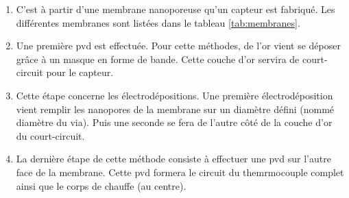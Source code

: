 \begin{itemize}
          \begin{enumerate}[label=(\alph*), wide, labelwidth=!, labelindent = 0pt]
              \item C'est à partir d'une membrane nanoporeuse qu'un capteur est fabriqué. Les différentes membranes sont listées dans le tableau
                    \ref{tab:membranes}. 
              \item Une première \gls{pvd} est effectuée. Pour cette méthodes, de l'or vient se déposer grâce à un masque en forme de bande.
                    Cette couche d'or servira de court-circuit pour le capteur. 
              \item Cette étape concerne les électrodépositions. Une première électrodéposition vient remplir les nanopores de la membrane sur
                    un diamètre défini (nommé diamètre du via). Puis une seconde se fera de l'autre côté de la couche d'or du court-circuit.
              \item La dernière étape de cette méthode consiste à effectuer une \gls{pvd} sur l'autre face de la membrane. Cette \gls{pvd} formera
                    le circuit du themrmocouple complet ainsi que le corps de chauffe (au centre). 
          \end{enumerate}
          

\end{itemize}
